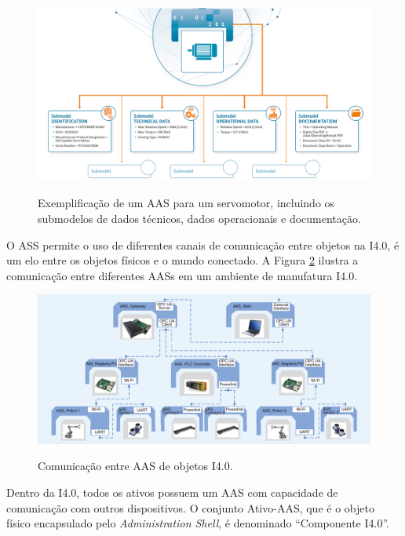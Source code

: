 \documentclass[
	12pt,				%
	oneside,			%
	a4paper,			%
	english,			%
	brazil				%
]{abntex2}
\begin{document}
	\begin{figure}[H]
		\centering
		\caption{Exemplificação de um AAS para um servomotor, incluindo os submodelos de dados técnicos, dados operacionais e documentação.}
		\includegraphics[width=1\textwidth]{aas-submodelos.png}
		\label{fig:aas-submodelos}
	\end{figure}
	
	O ASS permite o uso de diferentes canais de comunicação entre objetos na I4.0, é um elo entre os objetos físicos e o mundo conectado. A Figura \ref{fig:aas-conexao} ilustra a comunicação entre diferentes AASs em um ambiente de manufatura I4.0.
	
	\begin{figure}[H]
		\centering
		\caption{Comunicação entre AAS de objetos I4.0.}
		\includegraphics[width=1\textwidth]{aas-conexao.png}
		\label{fig:aas-conexao}
	\end{figure}

	Dentro da I4.0, todos os ativos possuem um AAS com capacidade de comunicação com outros dispositivos. O conjunto Ativo-AAS, que é o objeto físico encapsulado pelo \textit{Administration Shell}, é denominado ``Componente I4.0''.
	
\end{document}
